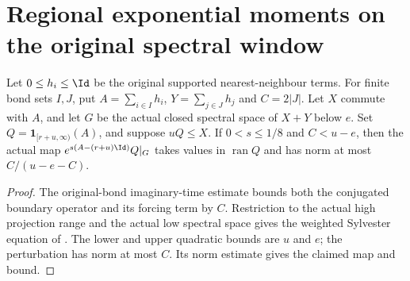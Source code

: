 \section{Regional exponential moments on the original spectral window}

\begin{lemma}
    \label{thm:nearest_neighbour_weighted_low_restriction}
    \leanok
    Let $0\le h_i\le\Id$ be the original supported nearest-neighbour terms.
    For finite bond sets $I,J$, put $A=\sum_{i\in I}h_i$,
    $Y=\sum_{j\in J}h_j$ and $C=2|J|$. Let $X$ commute with $A$, and let
    $G$ be the actual closed spectral space of $X+Y$ below $e$.
    Set $Q=\mathbf1_{[r+u,\infty)}(A)$, and suppose $uQ\le X$.
    If $0<s\le1/8$ and $C<u-e$, then the actual map
    $e^{s(A-(r+u)\Id)}Q|_G$ takes values in $\operatorname{ran}Q$ and has
    norm at most $C/(u-e-C)$.
\end{lemma}
\begin{proof}\leanok
    The original-bond imaginary-time estimate bounds both the conjugated
    boundary operator and its forcing term by $C$. Restriction to the
    actual high projection range and the actual low spectral space gives
    the weighted Sylvester equation of
    \cite[``Restricted weighted Sylvester equation'']{QICLean2026Blueprint}.
    The lower and upper quadratic bounds are $u$ and $e$; the perturbation
    has norm at most $C$. Its norm estimate gives the claimed map and bound.
\end{proof}

